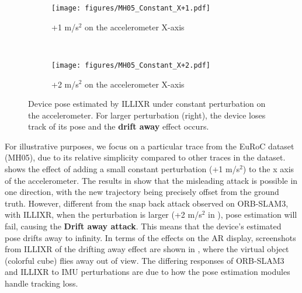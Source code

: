 \begin{figure}[h]
    \centering
        \begin{subfigure}[b]{0.22\textwidth}
            \centering
            \texttt{[image: figures/MH05\_Constant\_X+1.pdf]}
            \caption{+1 m/s$^2$ on the accelerometer X-axis}
            \label{subfig:illixr_acc_x_constant_3}
        \end{subfigure} ~
        \begin{subfigure}[b]{0.22\textwidth}
            \centering
            \texttt{[image: figures/MH05\_Constant\_X+2.pdf]}
            \caption{+2 m/s$^2$ on the accelerometer X-axis}
            \label{subfig:illixr_acc_x_constant_4}
        \end{subfigure}
    \caption{
    Device pose estimated by ILLIXR under constant perturbation on the accelerometer.
    For larger perturbation (right), the device loses track of its pose and the \textbf{drift away} effect occurs.
    }
    \label{fig:illixr_acc_constant}
\end{figure}
For illustrative purposes, we focus on a particular trace from the EuRoC dataset (MH05), due to its relative simplicity compared to other traces in the dataset.
 shows the effect of adding a small constant perturbation (+1 m/s$^2$) to the x axis of the accelerometer.
The results in  show that the misleading attack is possible in one direction, with the new trajectory being precisely offset from the ground truth.
However, different from the snap back attack observed on ORB-SLAM3, with ILLIXR, when the perturbation is larger (+2 m/s$^2$ in ), 
pose estimation will fail, causing the \textbf{Drift away attack}.
This means that the device's estimated pose drifts away to infinity.
In terms of the effects on the AR display, screenshots from ILLIXR of the drifting away effect are shown in , where the virtual object (colorful cube) flies away out of view.
The differing responses of ORB-SLAM3 and ILLIXR to IMU perturbations are due to how the pose estimation modules handle tracking loss.


